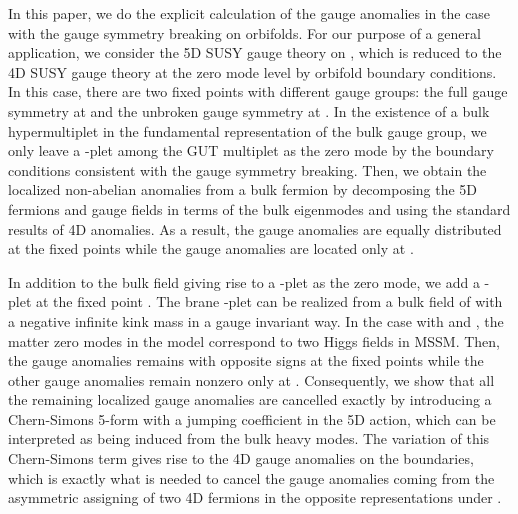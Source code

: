 \documentclass[a4paper,12pt]{article}
\begin{document}
In this paper, we do the explicit calculation of the gauge anomalies 
in the case with the gauge symmetry breaking on orbifolds. 
For our purpose of a general application, 
we consider the 5D SUSY \coordHE{} gauge theory on \coordHE{}, 
which is reduced to 
the 4D SUSY \coordHE{} gauge theory at the zero mode 
level by orbifold boundary conditions. 
In this case, there are two fixed points with different gauge groups: the full
gauge symmetry \coordHE{} at \coordHE{} and the unbroken gauge symmetry \coordHE{} at \coordHE{}. 
In the existence of a bulk hypermultiplet
in the fundamental representation of the bulk gauge group, 
we only leave a \coordHE{}-plet among the GUT multiplet as the zero mode by 
the boundary conditions consistent with the gauge symmetry breaking. 
Then, we obtain the localized non-abelian anomalies from a bulk fermion 
by decomposing the 5D fermions and gauge fields in terms of the bulk eigenmodes 
and using the standard results of 4D anomalies. 
As a result, the \coordHE{} gauge anomalies are equally distributed 
at the fixed points while the \coordHE{} gauge anomalies 
are located only at \coordHE{}. 

In addition to the bulk field giving rise to a \coordHE{}-plet as the zero mode,
we add a \coordHE{}-plet at the fixed point \coordHE{}. 
The brane \coordHE{}-plet can be realized from a bulk field of 
\coordHE{}
with a negative infinite kink mass in a gauge invariant way. 
In the case with \coordHE{} and \coordHE{}, the matter zero modes in the model 
correspond to two Higgs fields in MSSM.
Then, 
the \coordHE{} gauge anomalies remains with opposite signs at the fixed points
while the other gauge anomalies remain nonzero only at \coordHE{}.
Consequently, we show that all the remaining localized gauge anomalies 
are cancelled exactly by
introducing a Chern-Simons 5-form with a jumping coefficient in the 5D 
action, which can be interpreted as being induced from the bulk heavy 
modes\cite{ch,ah,pilo}. 
The variation of this Chern-Simons term gives rise to the 4D gauge 
anomalies on the boundaries, which is exactly what is needed to cancel the 
gauge anomalies coming from the asymmetric assigning of two 4D fermions 
in the opposite representations under \coordHE{}. 
\end{document}
